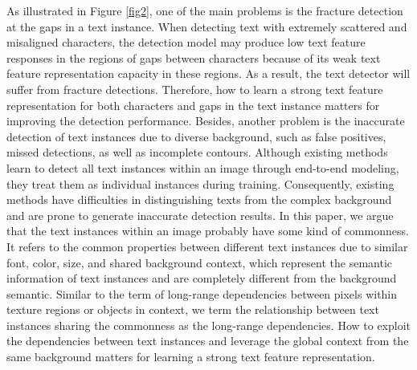 As illustrated in Figure \ref{fig2}, one of the main problems is the fracture detection at the gaps in a text instance. When detecting text with extremely scattered and misaligned characters, the detection model may produce low text feature responses in the regions of gaps between characters because of its weak text feature representation capacity in these regions. As a result, the text detector will suffer from fracture detections. Therefore, how to learn a strong text feature representation for both characters and gaps in the text instance matters for improving the detection performance. Besides, another problem is the inaccurate detection of text instances due to diverse background, such as false positives, missed detections, as well as incomplete contours. Although existing methods learn to detect all text instances within an image through end-to-end modeling, they treat them as individual instances during training. Consequently, existing methods have difficulties in distinguishing texts from the complex background and are prone to generate inaccurate detection results. In this paper, we argue that the text instances within an image probably have some kind of commonness. It refers to the common properties between different text instances due to similar font, color, size, and shared background context, which represent the semantic information of text instances and are completely different from the background semantic. Similar to the term of long-range dependencies between pixels within texture regions or objects in context, we term the relationship between text instances sharing the commonness as the long-range dependencies. How to exploit the dependencies between text instances and leverage the global context from the same background matters for learning a strong text feature representation.

